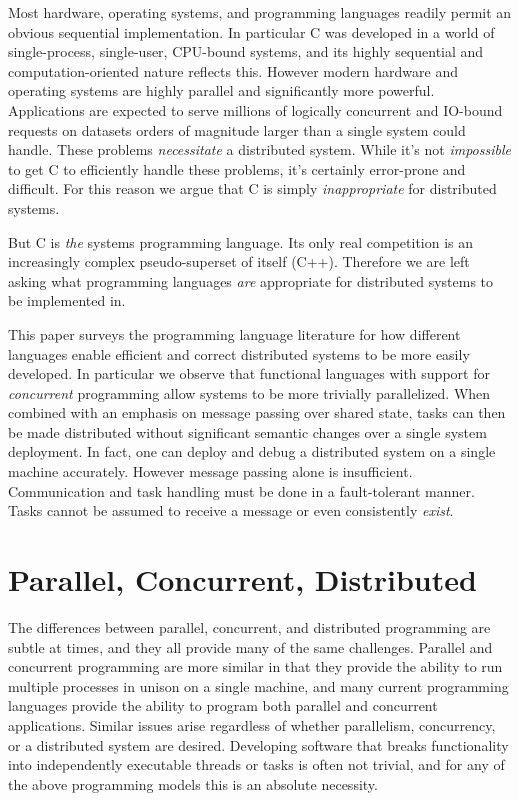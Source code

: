 \documentclass[10pt,a4paper,twocolumn]{article}
\begin{document}
Most hardware, operating systems, and programming languages readily permit an
obvious sequential implementation. In particular C was developed in a world of
single-process, single-user, CPU-bound systems, and its highly sequential and
computation-oriented nature reflects this. However modern hardware
and operating systems are highly parallel and significantly more powerful.
Applications are expected to serve millions of logically concurrent and IO-bound
requests on datasets orders of magnitude larger than a single system could
handle. These problems \emph{necessitate} a distributed system. While it's not
\emph{impossible} to get C to efficiently handle these problems, it's certainly
error-prone and difficult. For this reason we argue that C is simply
\emph{inappropriate} for distributed systems.

But C is \emph{the} systems programming language. Its only real competition is
an increasingly complex pseudo-superset of itself (C++). Therefore we are left
asking what programming languages \emph{are} appropriate for distributed systems
to be implemented in.

This paper surveys the programming language literature for how different
languages enable efficient and correct distributed systems to be more easily
developed. In particular we observe that functional languages with support for
\emph{concurrent} programming allow systems to be more trivially parallelized.
When combined with an emphasis on message passing over shared state, tasks can
then be made distributed without significant semantic changes over a single
system deployment. In fact, one can deploy and debug a distributed system on a
single machine accurately. However message passing alone is insufficient.
Communication and task handling must be done in a fault-tolerant manner. Tasks
cannot be assumed to receive a message or even consistently \emph{exist}.

\section{Parallel, Concurrent, Distributed}
The differences between parallel, concurrent, and distributed programming are
subtle at times, and they all provide many of the same challenges. Parallel and
concurrent programming are more similar in that they provide the ability to run
multiple processes in unison on a single machine, and many current programming
languages provide the ability to program both parallel and concurrent
applications. Similar issues arise regardless of whether parallelism,
concurrency, or a distributed system are desired. Developing software that
breaks functionality into independently executable threads or tasks is often not
trivial, and for any of the above programming models this is an absolute
necessity.
\end{document}
